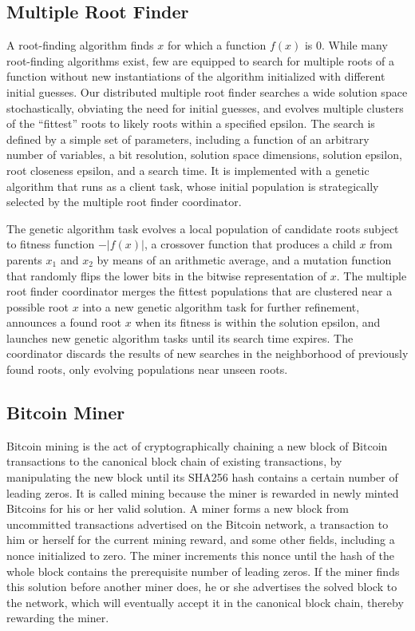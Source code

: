 \documentclass [11pt, twocolumn] {article}
\begin{document}
\subsection {Multiple Root Finder} 

\newcommand{\abs}[1]{\lvert{#1}\rvert}

A root-finding algorithm finds $x$ for which a function $f(x)$ is 0. While many root-finding algorithms exist, few are equipped to search for multiple roots of a function without new instantiations of the algorithm initialized with different initial guesses. Our distributed multiple root finder searches a wide solution space stochastically, obviating the need for initial guesses, and evolves multiple clusters of the ``fittest'' roots to likely roots within a specified epsilon. The search is defined by a simple set of parameters, including a function of an arbitrary number of variables, a bit resolution, solution space dimensions, solution epsilon, root closeness epsilon, and a search time. It is implemented with a genetic algorithm that runs as a client task, whose initial population is strategically selected by the multiple root finder coordinator.

The genetic algorithm task evolves a local population of candidate roots subject to fitness function $-\abs{f(x)}$, a crossover function that produces a child $x$ from parents $x_1$ and $x_2$ by means of an arithmetic average, and a mutation function that randomly flips the lower bits in the bitwise representation of $x$. The multiple root finder coordinator merges the fittest populations that are clustered near a possible root $x$ into a new genetic algorithm task for further refinement, announces a found root $x$ when its fitness is within the solution epsilon, and launches new genetic algorithm tasks until its search time expires. The coordinator discards the results of new searches in the neighborhood of previously found roots, only evolving populations near unseen roots.

\subsection {Bitcoin Miner}

Bitcoin mining is the act of cryptographically chaining a new block of Bitcoin transactions to the canonical block chain of existing transactions, by manipulating the new block until its SHA256 hash contains a certain number of leading zeros. It is called mining because the miner is rewarded in newly minted Bitcoins for his or her valid solution. A miner forms a new block from uncommitted transactions advertised on the Bitcoin network, a transaction to him or herself for the current mining reward, and some other fields, including a nonce initialized to zero. The miner increments this nonce until the hash of the whole block contains the prerequisite number of leading zeros. If the miner finds this solution before another miner does, he or she advertises the solved block to the network, which will eventually accept it in the canonical block chain, thereby rewarding the miner.
\end{document}
